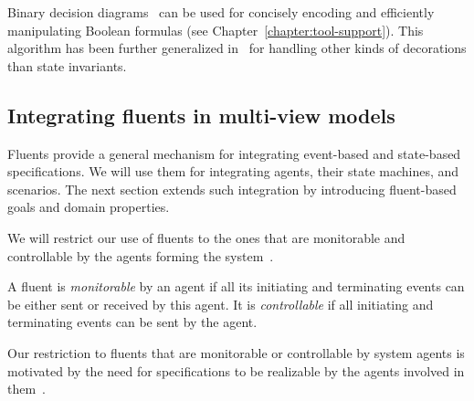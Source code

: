 Binary decision diagrams~\cite{Bryant:1986} can be used for concisely encoding and efficiently manipulating Boolean formulas (see Chapter~\ref{chapter:tool-support}). This algorithm has been further generalized in~\cite{Damas:2011} for handling other kinds of decorations than state invariants.

\subsection{Integrating fluents in multi-view models}

Fluents provide a general mechanism for integrating event-based and state-based specifications. We will use them for integrating agents, their state machines, and scenarios. The next section extends such integration by introducing fluent-based goals and domain properties.

We will restrict our use of fluents to the ones that are monitorable and controllable by the agents forming the system~\cite{Letier:2002}. 

A fluent is \emph{monitorable} by an agent if all its initiating and terminating events can be either sent or received by this agent. It is \emph{controllable} if all initiating and terminating events can be sent by the agent. 

Our restriction to fluents that are monitorable or controllable by system agents is motivated by the need for specifications  to be realizable by the agents involved in them~\cite{Letier:2002}.
